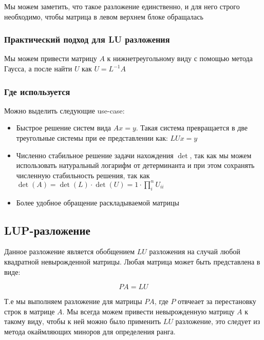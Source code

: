 \documentclass{article}
\begin{document}
    Мы можем заметить, что такое разложение единственно, и для него строго необходимо, чтобы матрица в левом верхнем блоке обращалась

    \subsubsection{Практический подход для LU разложения}

    Мы можем привести матрицу $A$ к нижнетреугольному виду с помощью метода Гаусса, а после найти $U$ как $U = L^{-1}A$


    \subsubsection{Где используется}

    Можно выделить следующие use-case: 

    \begin{itemize}
        \item Быстрое решение систем вида $Ax = y$. Такая система превращается в две треугольные системы при ее представлении как: $LUx = y$    
        \item Численно стабильное решение задачи нахождения $\det$, так как мы можем использовать натуральный логарифм от 
        детерминанта и при этом сохранять численную стабильность решения, так как $\det(A) = \det(L) \cdot \det(U) = 1 \cdot \prod_{i}^{n} U_{ii}$  
        \item Более удобное обращение раскладываемой матрицы
    \end{itemize}

    \subsection{LUP-разложение}

    Данное разложение является обобщением $LU$ разложения на случай любой квадратной невырожденной матрицы. Любая матрица может быть представлена в виде: 

    \begin{equation}
        PA = LU
    \end{equation}

    Т.е мы выполняем разложение для матрицы $PA$, где $P$ отвчеает за перестановку строк в матрице $A$. Мы всегда можем привести невырожденную матрицу $A$ к такому виду, чтобы 
    к ней можно было применить $LU$ разложение, это следует из метода окаймляющих миноров для определения ранга.
\end{document}
